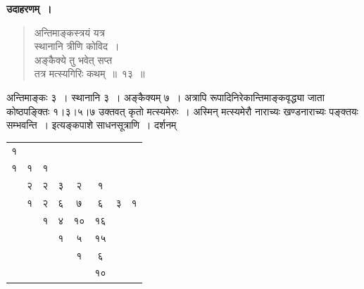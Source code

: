 \documentclass[11pt, openany]{book}
\begin{document}
\textbf{उदाहरणम्~।} 
\begin{quote}
{\ex अन्तिमाङ्कस्त्रयं यत्र\\
स्थानानि त्रीणि कोविद~। \\
अङ्कैक्ये तु भवेत् सप्त\\
तत्र मत्स्यगिरिः कथम्~॥~१३~॥~}	
\end{quote}

अन्तिमाङ्कः ३~। स्थानानि ३~। अङ्कैक्यम् ७~। अत्रापि रूपादिनिरेकान्तिमाङ्कवृद्ध्या जाता कोष्ठपङ्क्तिः १।३।५।७ उक्तवत् कृतो मत्स्यमेरुः~। अस्मिन् मत्स्यमेरौ नाराच्यः खण्डनाराच्यः पङ्क्तयः सम्भवन्ति~। इत्यङ्कपाशे साधनसूत्राणि~। दर्शनम् 
\vspace{2mm}

\begin{table}[h]
	\centering
	\begin{tabular}{|c|c|c|c|c|c|c|c|}
		\cline{1-1}
		{\hbox{१}} &  \multicolumn{1}{c}{}  & \multicolumn{1}{c}{} & \multicolumn{1}{c}{}  & \multicolumn{1}{c}{} & \multicolumn{1}{c}{} & \multicolumn{1}{c}{}& \multicolumn{1}{c}{}  \\
		\cline{1-3}
		{\hbox{१}} &  	{\hbox{१}}  & 	{\hbox{१}} & \multicolumn{1}{c}{}  & \multicolumn{1}{c}{} & \multicolumn{1}{c}{} & \multicolumn{1}{c}{}& \multicolumn{1}{c}{} \\
	\cline{1-6}	
	\multicolumn{1}{c|}{} &  	{\hbox{२}}  & 	{\hbox{२}} & {\hbox{३}}  &{\hbox{२}} & {\hbox{१}} & \multicolumn{1}{c}{}& \multicolumn{1}{c}{} \\
	\cline{2-8}	
	\multicolumn{1}{c|}{} &  	{\hbox{१}}  & 	{\hbox{२}} & {\hbox{६}}  &{\hbox{७}} & {\hbox{६}} & {\hbox{३}}& {\hbox{१}}  \\
	\cline{2-8}	
	\multicolumn{1}{c}{} &  	\multicolumn{1}{c|}{} & 	{\hbox{१}} & {\hbox{४}}  &{\hbox{१०}} & {\hbox{१६}} & 	\multicolumn{1}{c}{} & 	\multicolumn{1}{c}{}  \\
	\cline{3-6}
		\multicolumn{1}{c}{} &  	\multicolumn{1}{c}{} & 		\multicolumn{1}{c|}{} & {\hbox{१}}  &{\hbox{५}} & {\hbox{१५}} & 	\multicolumn{1}{c}{} & 	\multicolumn{1}{c}{}  \\
	\cline{4-6}	
	\multicolumn{1}{c}{} &  	\multicolumn{1}{c}{} & 		\multicolumn{1}{c}{} & 	\multicolumn{1}{c|}{} &{\hbox{१}} & {\hbox{६}} & 	\multicolumn{1}{c}{} & 	\multicolumn{1}{c}{}  \\
	\cline{5-6}	
			\multicolumn{1}{c}{} &  	\multicolumn{1}{c}{} & 		\multicolumn{1}{c}{} & 	\multicolumn{1}{c}{} &\multicolumn{1}{c|}{}& {\hbox{१०}} & 	\multicolumn{1}{c}{} & 	\multicolumn{1}{c}{}  \\
		\cline{6-6}	
		
	\end{tabular}
\end{table}
\end{document}
